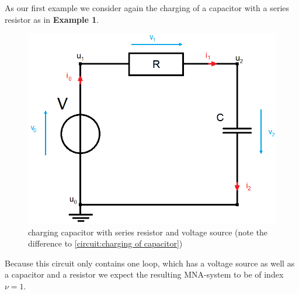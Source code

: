 \begin{example1}
	\label{ex:Index_Analysis}
	As our first example we consider again the charging of a capacitor with a series resistor as in \textbf{Example 1}.
	\begin{figure}[H]
		\centering
		\includegraphics[scale = 0.4]{pictures/Example1_simple_p2.png}
		\caption{charging capacitor with series resistor and voltage source (note the difference to \ref{circuit:charging of capacitor})} 
	\end{figure}
	Because this circuit only contains one loop, which has a voltage source as well as a capacitor and a resistor we expect the resulting MNA-system to be of index $\nu=1$. 
	

\end{example1}
